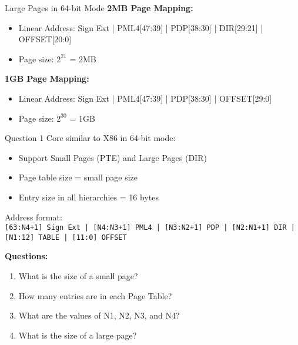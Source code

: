 \documentclass[aspectratio=169,12pt]{beamer}
\begin{document}
\begin{frame}{Large Pages in 64-bit Mode}
\textbf{2MB Page Mapping:}
\begin{itemize}
    \item Linear Address: Sign Ext | PML4[47:39] | PDP[38:30] | DIR[29:21] | OFFSET[20:0]
    \item Page size: $2^{21}$ = 2MB
\end{itemize}

\vspace{1em}
\textbf{1GB Page Mapping:}
\begin{itemize}
    \item Linear Address: Sign Ext | PML4[47:39] | PDP[38:30] | OFFSET[29:0]
    \item Page size: $2^{30}$ = 1GB
\end{itemize}
\end{frame}

\begin{frame}{Question 1}
Core similar to X86 in 64-bit mode:
\begin{itemize}
    \item Support Small Pages (PTE) and Large Pages (DIR)
    \item Page table size = small page size
    \item Entry size in all hierarchies = 16 bytes
\end{itemize}

\vspace{0.5em}
Address format:\\
\texttt{[63:N4+1] Sign Ext | [N4:N3+1] PML4 | [N3:N2+1] PDP | [N2:N1+1] DIR | [N1:12] TABLE | [11:0] OFFSET}

\vspace{0.5em}
\textbf{Questions:}
\begin{enumerate}
    \item What is the size of a small page?
    \item How many entries are in each Page Table?
    \item What are the values of N1, N2, N3, and N4?
    \item What is the size of a large page?
\end{enumerate}
\end{frame}
\end{document}
